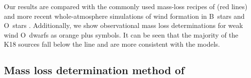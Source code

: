 Our results are compared with the commonly used mass-loss recipes of
\citet{Vink:2000a} (red lines) and more recent whole-atmosphere
simulations of wind formation in B~stars \citep{Krticka:2014a} and
O~stars \citep{Krticka:2017a}.  Additionally, we show observational
mass loss determinations for weak wind O~dwarfs
\citep{Marcolino:2009a} as orange plus symbols.  It can be seen that
the majority of the K18 sources fall below the \citeauthor{Vink:2000a}
line and are more consistent with the \citet{Krticka:2017a} models.

\subsection{Mass loss determination method of \protect\citet{Kobulnicky:2018a}}
\label{app:bow-shock-data}





